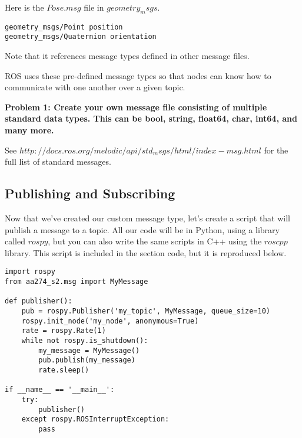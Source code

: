 Here is the $Pose.msg$ file in $geometry_msgs$.

\begin{tcolorbox}
\begin{lstlisting}
geometry_msgs/Point position
geometry_msgs/Quaternion orientation
\end{lstlisting}
\end{tcolorbox}

Note that it references message types defined in other message files.

ROS uses these pre-defined message types so that nodes can know how to communicate with one another over a given topic.

\textbf{Problem 1: Create your own message file consisting of multiple standard data types. This can be bool, string, float64, char, int64, and many more. }

See $http://docs.ros.org/melodic/api/std_msgs/html/index-msg.html$ for the full list of standard messages.


\subsection{Publishing and Subscribing}
Now that we've created our custom message type, let's create a script that will publish a message to a topic. All our code will be in Python, using a library called $rospy$, but you can also write the same scripts in C++ using the $roscpp$ library. This script is included in the section code, but it is reproduced below.

\begin{tcolorbox}
\begin{lstlisting}
import rospy
from aa274_s2.msg import MyMessage

def publisher():
    pub = rospy.Publisher('my_topic', MyMessage, queue_size=10)
    rospy.init_node('my_node', anonymous=True)
    rate = rospy.Rate(1)
    while not rospy.is_shutdown():
        my_message = MyMessage()
        pub.publish(my_message)
        rate.sleep()

if __name__ == '__main__':
    try:
        publisher()
    except rospy.ROSInterruptException:
        pass
\end{lstlisting}
\end{tcolorbox}


